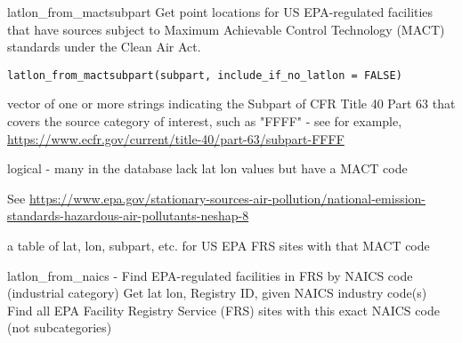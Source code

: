 \documentclass[a4paper]{book}
\begin{document}
%
\begin{Description}\relax
latlon\_from\_mactsubpart
Get point locations for US EPA-regulated facilities that have
sources subject to Maximum Achievable Control Technology (MACT) standards
under the Clean Air Act.
\end{Description}
%
\begin{Usage}
\begin{verbatim}
latlon_from_mactsubpart(subpart, include_if_no_latlon = FALSE)
\end{verbatim}
\end{Usage}
%
\begin{Arguments}
\begin{ldescription}
\item[\code{subpart}] vector of one or more strings indicating the
Subpart of CFR Title 40 Part 63 that covers the source category
of interest, such as "FFFF" - see for example,
\url{https://www.ecfr.gov/current/title-40/part-63/subpart-FFFF}

\item[\code{include\_if\_no\_latlon}] logical - many in the database lack lat lon values but have a MACT code
\end{ldescription}
\end{Arguments}
%
\begin{Details}\relax
See \url{https://www.epa.gov/stationary-sources-air-pollution/national-emission-standards-hazardous-air-pollutants-neshap-8}
\end{Details}
%
\begin{Value}
a table of lat, lon, subpart, etc. for US EPA FRS sites with that MACT code
\end{Value}
%
\begin{Description}\relax
latlon\_from\_naics - Find EPA-regulated facilities in FRS by NAICS code (industrial category)
Get lat lon, Registry ID, given NAICS industry code(s)
Find all EPA Facility Registry Service (FRS) sites with this exact NAICS code (not subcategories)
\end{Description}
\end{document}
